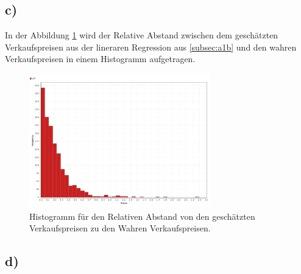 \subsection{c)}
\label{subsec:a1c}
In der Abbildung \ref{fig:hist} wird der Relative Abstand zwischen dem geschätzten Verkaufspreisen aus
der lineraren Regression aus \ref{subsec:a1b} und den wahren Verkaufspreisen in einem
Histogramm aufgetragen.

\FloatBarrier

\begin{figure}
  \centering
  \includegraphics[width=0.7\textwidth]{histogramm.png}
  \caption{Histogramm für den Relativen Abstand von den geschätzten Verkaufspreisen
  zu den Wahren Verkaufspreisen.}
  \label{fig:hist}
\end{figure}

\FloatBarrier



\subsection{d)}
\label{subsec:a1d}
